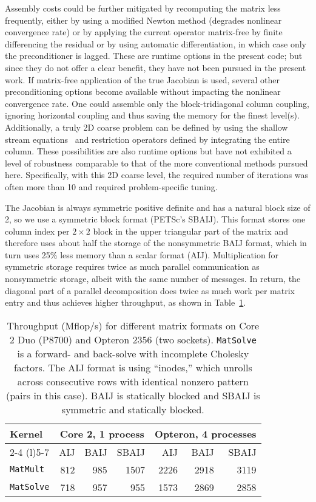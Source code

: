 Assembly costs could be further mitigated by recomputing the matrix less frequently, either by using a modified Newton method (degrades nonlinear convergence rate) or by applying the current operator matrix-free by finite differencing the residual or by using automatic differentiation, in which case only the preconditioner is lagged.
These are runtime options in the present code; but since they do not offer a clear benefit, they have not been pursued in the present work.
If matrix-free application of the true Jacobian is used, several other preconditioning options become available without impacting the nonlinear convergence rate.
One could assemble only the block-tridiagonal column coupling, ignoring horizontal coupling and thus saving the memory for the finest level(s).
Additionally, a truly 2D coarse problem can be defined by using the shallow stream equations~\citep{morland1987unconfined,weis1999theory,schoof2006variational} and restriction operators defined by integrating the entire column.
These possibilities are also runtime options but have not exhibited a level of robustness comparable to that of the more conventional methods pursued here.
Specifically, with this 2D coarse level, the required number of iterations was often more than 10 and required problem-specific tuning.

The Jacobian is always symmetric positive definite and has a natural block size of 2, so we use a symmetric block format (PETSc's SBAIJ).  This format stores one column index per $2\times 2$ block in the upper triangular part of the matrix and therefore uses about half the storage of the nonsymmetric BAIJ format, which in turn uses 25\% less memory than a scalar format (AIJ). Multiplication for symmetric storage requires twice as much parallel communication as nonsymmetric storage, albeit with the same number of messages. In return, the diagonal part of a parallel decomposition does twice as much work per matrix entry and thus achieves higher throughput, as shown in Table~\ref{tab:sbaij}.

\begin{table}
  \centering\caption{Throughput (Mflop/s) for different matrix formats on Core 2 Duo (P8700) and Opteron 2356 (two sockets). \texttt{MatSolve} is a forward- and back-solve with incomplete Cholesky factors.  The AIJ format is using ``inodes,'' which unrolls across consecutive rows with identical nonzero pattern (pairs in this case). BAIJ is statically blocked and SBAIJ is symmetric and statically blocked.}\label{tab:sbaij}
  \begin{tabular}{l rrr rrr}
    \toprule
    \multirow{3}{*}{Kernel} & \multicolumn{3}{c}{Core 2, 1 process} & \multicolumn{3}{c}{Opteron, 4 processes} \\
    \cmidrule(r){2-4} \cmidrule(l){5-7}
                      & AIJ & BAIJ & SBAIJ & AIJ  & BAIJ & SBAIJ \\
    \midrule
    \texttt{MatMult}  & 812 & 985  & 1507  & 2226 & 2918 & 3119  \\
    \texttt{MatSolve} & 718 & 957  & 955   & 1573 & 2869 & 2858  \\
    \bottomrule
  \end{tabular}
\end{table}


